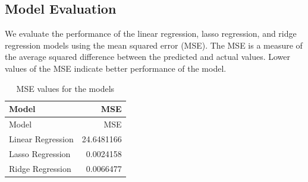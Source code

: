 \documentclass[
]{article}
\newenvironment{Shaded}{\begin{snugshade}}{\end{snugshade}}
\newcommand{\AttributeTok}[1]{\textcolor[rgb]{0.13,0.29,0.53}{#1}}
\newcommand{\DecValTok}[1]{\textcolor[rgb]{0.00,0.00,0.81}{#1}}
\newcommand{\FunctionTok}[1]{\textcolor[rgb]{0.13,0.29,0.53}{\textbf{#1}}}
\newcommand{\NormalTok}[1]{#1}
\newcommand{\OtherTok}[1]{\textcolor[rgb]{0.56,0.35,0.01}{#1}}
\newcommand{\SpecialCharTok}[1]{\textcolor[rgb]{0.81,0.36,0.00}{\textbf{#1}}}
\newcommand{\StringTok}[1]{\textcolor[rgb]{0.31,0.60,0.02}{#1}}
\begin{document}
\subsection{Model Evaluation}\label{model-evaluation}

We evaluate the performance of the linear regression, lasso regression,
and ridge regression models using the mean squared error (MSE). The MSE
is a measure of the average squared difference between the predicted and
actual values. Lower values of the MSE indicate better performance of
the model.

\begin{Shaded}
\end{Shaded}

\begin{longtable}[]{@{}lr@{}}
\caption{MSE values for the models}\tabularnewline
\toprule\noalign{}
Model & MSE \\
\midrule\noalign{}
\endfirsthead
\toprule\noalign{}
Model & MSE \\
\midrule\noalign{}
\endhead
\bottomrule\noalign{}
\endlastfoot
Linear Regression & 24.6481166 \\
Lasso Regression & 0.0024158 \\
Ridge Regression & 0.0066477 \\
\end{longtable}
\end{document}

